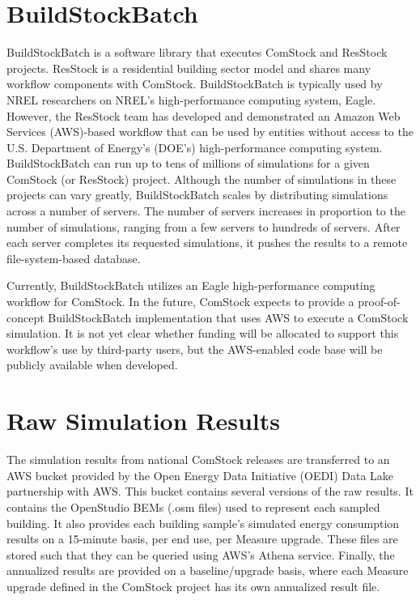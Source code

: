 \section{BuildStockBatch}
\label{sec:buildstockbatch}

BuildStockBatch is a software library that executes ComStock and ResStock projects. ResStock is a residential building sector model and shares many workflow components with ComStock.  BuildStockBatch is typically used by NREL researchers on NREL's high-performance computing system, Eagle. However, the ResStock team has developed and demonstrated an Amazon Web Services (AWS)-based workflow that can be used by entities without access to the U.S. Department of Energy's (DOE's) high-performance computing system. BuildStockBatch can run up to tens of millions of simulations for a given ComStock (or ResStock) project. Although the number of simulations in these projects can vary greatly, BuildStockBatch scales by distributing simulations across a number of servers. The number of servers increases in proportion to the number of simulations, ranging from a few servers to hundreds of servers. After each server completes its requested simulations, it pushes the results to a remote file-system-based database.

Currently, BuildStockBatch utilizes an Eagle high-performance computing workflow for ComStock. In the future, ComStock expects to provide a proof-of-concept BuildStockBatch implementation that uses AWS to execute a ComStock simulation. It is not yet clear whether funding will be allocated to support this workflow's use by third-party users, but the AWS-enabled code base will be publicly available when developed.

\section{Raw Simulation Results}
\label{rawsimulationresults}
The simulation results from national ComStock releases are transferred to an AWS bucket provided by the Open Energy Data Initiative (OEDI) Data Lake partnership with AWS. This bucket contains several versions of the raw results. It contains the OpenStudio BEMs (.osm files) used to represent each sampled building. It also provides each building sample's simulated energy consumption results on a 15-minute basis, per end use, per Measure upgrade. These files are stored such that they can be queried using AWS's Athena service. Finally, the annualized results are provided on a baseline/upgrade basis, where each Measure upgrade defined in the ComStock project has its own annualized result file.

